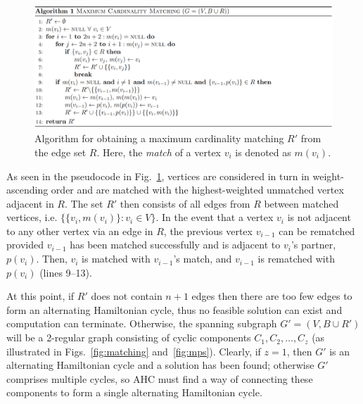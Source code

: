 \documentclass[authoryear]{elsarticle}
\begin{document}
\begin{figure}[h!]	
	\centering
	\includegraphics[width=\textwidth]{figures/AlgorithmMCM}
	\caption{Algorithm for obtaining a maximum cardinality matching $R'$ from the edge set $R$. Here, the \emph{match} of a vertex $v_i$ is denoted as $m(v_i)$.}	
	\label{fig:algmcm}
\end{figure}

\noindent As seen in the pseudocode in Fig.~\ref{fig:algmcm}, vertices are considered in turn in weight-ascending order and are matched with the highest-weighted unmatched vertex adjacent in $R$. The set $R'$ then consists of all edges from $R$ between matched vertices, i.e. $\{\{v_i, m(v_i)\} : v_i \in V \}$. In the event that a vertex $v_i$ is not adjacent to any other vertex via an edge in $R$, the previous vertex $v_{i-1}$ can be rematched provided $v_{i-1}$ has been matched successfully and is adjacent to $v_i$'s partner, $p(v_i)$. Then, $v_i$ is matched with $v_{i-1}$'s match, and $v_{i-1}$ is rematched with $p(v_i)$ (lines 9--13).

At this point, if $R'$ does not contain $n+1$ edges then there are too few edges to form an alternating Hamiltonian cycle, thus no feasible solution can exist and computation can terminate. Otherwise, the spanning subgraph $G'=(V, B \cup R')$ will be a 2-regular graph consisting of cyclic components $C_1,C_2,\dotsc,C_z$ (as illustrated in Figs.~\ref{fig:matching} and~\ref{fig:mps}). Clearly, if $z = 1$, then $G'$ is an alternating Hamiltonian cycle and a solution has been found; otherwise $G'$ comprises multiple cycles, so AHC must find a way of connecting these components to form a single alternating Hamiltonian cycle.
\end{document}
